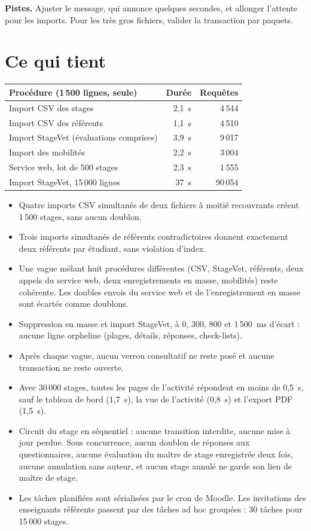 \documentclass[11pt,a4paper]{article}
\begin{document}
\textbf{Pistes.} Ajuster le message, qui annonce \og quelques secondes\fg{}, et allonger l'attente
pour les imports. Pour les très gros fichiers, valider la transaction par paquets.

\section{Ce qui tient}

\begin{center}
\begin{tabularx}{\linewidth}{@{}X r r@{}}
\toprule
\textbf{Procédure (1\,500 lignes, seule)} & \textbf{Durée} & \textbf{Requêtes} \\
\midrule
Import CSV des stages & 2,1~s & 4\,544 \\
Import CSV des référents & 1,1~s & 4\,510 \\
Import StageVet (évaluations comprises) & 3,9~s & 9\,017 \\
Import des mobilités & 2,2~s & 3\,004 \\
Service web, lot de 500 stages & 2,3~s & 1\,555 \\
Import StageVet, 15\,000 lignes & 37~s & 90\,054 \\
\bottomrule
\end{tabularx}
\end{center}

\begin{itemize}
  \item Quatre imports CSV simultanés de deux fichiers à moitié recouvrants créent 1\,500 stages,
    sans aucun doublon.
  \item Trois imports simultanés de référents contradictoires donnent exactement deux référents
    par étudiant, sans violation d'index.
  \item Une vague mêlant huit procédures différentes (CSV, StageVet, référents, deux appels du
    service web, deux enregistrements en masse, mobilités) reste cohérente. Les doubles envois
    du service web et de l'enregistrement en masse sont écartés comme doublons.
  \item Suppression en masse et import StageVet, à 0, 300, 800 et 1\,500~ms d'écart : aucune
    ligne orpheline (plages, détails, réponses, check-lists).
  \item Après chaque vague, aucun verrou consultatif ne reste posé et aucune transaction ne
    reste ouverte.
  \item Avec 30\,000 stages, toutes les pages de l'activité répondent en moins de 0,5~s, sauf le
    tableau de bord (1,7~s), la vue de l'activité (0,8~s) et l'export PDF (1,5~s).
  \item Circuit du stage en séquentiel : aucune transition interdite, aucune mise à jour perdue.
    Sous concurrence, aucun doublon de réponses aux questionnaires, aucune évaluation du maître
    de stage enregistrée deux fois, aucune annulation sans auteur, et aucun stage annulé ne garde
    son lien de maître de stage.
  \item Les tâches planifiées sont sérialisées par le cron de Moodle. Les invitations des
    enseignants référents passent par des tâches ad hoc groupées : 30 tâches pour
    15\,000 stages.
\end{itemize}
\end{document}
